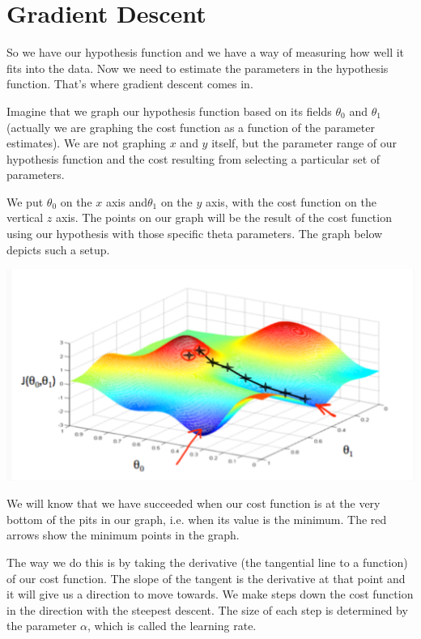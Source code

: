 \documentclass[10pt,a4paper,UTF8]{article}
\begin{document}
\section{Gradient Descent}
\label{sec:orgf077947}


So we have our hypothesis function and we have a way of measuring how well it fits into the data. Now we need to estimate the parameters in the hypothesis function. That's where gradient descent comes in.

Imagine that we graph our hypothesis function based on its fields \(\theta_{0}\) and \(\theta_{1}\) (actually we are graphing the cost function as a function of the parameter estimates). We are not graphing \(x\) and \(y\) itself, but the parameter range of our hypothesis function and the cost resulting from selecting a particular set of parameters.

We put \(\theta_{0}\) on the \(x\) axis and\(\theta_{1}\) on the \(y\) axis, with the cost function on the vertical \(z\) axis. The points on our graph will be the result of the cost function using our hypothesis with those specific theta parameters. The graph below depicts such a setup.

\begin{center}
\includegraphics[width=.9\linewidth]{../../img/computer_ng/20171006gradientDescent.png}
\end{center}

We will know that we have succeeded when our cost function is at the very bottom of the pits in our graph, i.e. when its value is the minimum. The red arrows show the minimum points in the graph.

The way we do this is by taking the derivative (the tangential line to a function) of our cost function. The slope of the tangent is the derivative at that point and it will give us a direction to move towards. We make steps down the cost function in the direction with the steepest descent. The size of each step is determined by the parameter \(\alpha\), which is called the learning rate.
\end{document}
